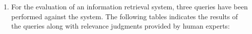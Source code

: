 \documentclass[exam, sectionseven]{acAssignment}
\begin{document}
\begin{enumerate}
        :
        Complete the formulas below by filling in nominator and denominator of the fractions.
        
        \newcommand*{\myFracField}[1]{%
            \acIfSolution%
                {\begin{minipage}{7cm}%
                    \centering\textcolor{acSolution}{#1}%
                    \end{minipage}}%
                {\hspace{7cm}}}
        
        \vspace{1cm}
        \begin{align*}
            \text{Precision} &= \dfrac
                {\myFracField{\textbf{TP}}}
                {\myFracField{\textbf{TP} + \textbf{FP}}}
            \\[2cm]
            \text{Recall} &= \dfrac
                {\myFracField{\textbf{TP}}}
                {\myFracField{\textbf{TP} + \textbf{FN}}}
            \\[2cm]
            \text{Accuracy} &= \dfrac
                {\myFracField{\textbf{TP} + \textbf{TN}}}
                {\myFracField{\textbf{TP} + \textbf{FP} + \textbf{FN} + \textbf{TN}}}
        \end{align*}
        \vspace{\fill}
    
    \clearpage
    \item For the evaluation of an information retrieval system, three queries have been performed against the system.
        The following tables indicates the results of the queries along with relevance judgments provided by human experts:
        

\end{enumerate}
\end{document}
